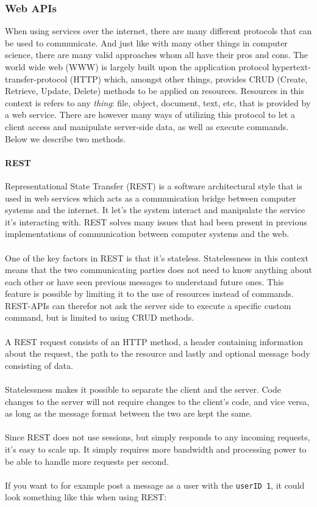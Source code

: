\documentclass{article}
\begin{document}
\subsubsection{Web APIs}

When using services over the internet, there are many different protocols that can be used to communicate.
And just like with many other things in computer science, there are many valid approaches whom all have their
pros and cons. The world wide web (WWW) is largely built upon the application protocol
hypertext-transfer-protocol (HTTP) which, amongst other things, provides CRUD (Create, Retrieve, Update, Delete)
methods to be applied on resources. Resources in this context is refers to any \textit{thing}: file, object, document,
text, etc, that is provided by a web service. There are however many ways of utilizing this protocol to let a
client access and manipulate server-side data, as well as execute commands. Below we describe two methods.

\paragraph{REST}

Representational State Transfer (REST) is a software architectural style
that is used in web services which acts as a communication bridge
between computer systems and the internet. It let's the system interact
and manipulate the service it's interacting with. REST solves many
issues that had been present in previous implementations of
communication between computer systems and the web.
\\ \\
One of the key factors in REST is that it's stateless. Statelessness in
this context means that the two communicating parties does not need to
know anything about each other or have seen previous messages to
understand future ones. This feature is possible by limiting it to the
use of resources instead of commands. REST-APIs can therefor not ask the
server side to execute a specific custom command, but is limited to
using CRUD methods.
\\ \\
A REST request consists of an HTTP method, a header containing
information about the request, the path to the resource and lastly and
optional message body consisting of data.\cite{rest1}\cite{rest2}
\\ \\
Statelessness makes it possible to separate the client and the server.
Code changes to the server will not require changes to the client's
code, and vice versa, as long as the message format between the two are
kept the same.
\\ \\
Since REST does not use sessions, but simply responds to any incoming
requests, it's easy to scale up. It simply requires more bandwidth and
processing power to be able to handle more requests per second.
\\ \\
If you want to for example post a message as a user with the \texttt{userID 1}, it
could look something like this when using REST:
\end{document}
